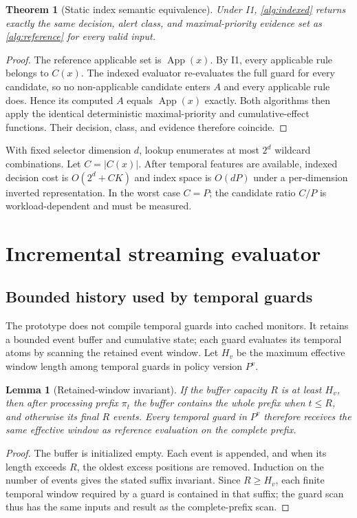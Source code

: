 \documentclass[11pt]{article}
\newtheorem{lemma}{Lemma}[section]
\newtheorem{theorem}{Theorem}[section]
\theoremstyle{remark}
\newcommand{\App}{\operatorname{App}}
\begin{document}
\begin{theorem}[Static index semantic equivalence]\label{thm:indexeq}
Under I1, \cref{alg:indexed} returns exactly the same decision, alert class, and maximal-priority evidence set as \cref{alg:reference} for every valid input.
\end{theorem}
\begin{proof}
The reference applicable set is $\App(x)$. By I1, every applicable rule belongs to $C(x)$. The indexed evaluator re-evaluates the full guard for every candidate, so no non-applicable candidate enters $A$ and every applicable rule does. Hence its computed $A$ equals $\App(x)$ exactly. Both algorithms then apply the identical deterministic maximal-priority and cumulative-effect functions. Their decision, class, and evidence therefore coincide.
\end{proof}

With fixed selector dimension $d$, lookup enumerates at most $2^d$ wildcard combinations. Let $C=|C(x)|$. After temporal features are available, indexed decision cost is $O(2^d+CK)$ and index space is $O(dP)$ under a per-dimension inverted representation. In the worst case $C=P$; the candidate ratio $C/P$ is workload-dependent and must be measured.

\section{Incremental streaming evaluator}

\subsection{Bounded history used by temporal guards}
The prototype does not compile temporal guards into cached monitors. It retains a bounded event buffer and cumulative state; each guard evaluates its temporal atoms by scanning the retained event window. Let $H_v$ be the maximum effective window length among temporal guards in policy version $P^v$.

\begin{lemma}[Retained-window invariant]\label{lem:monitor}
If the buffer capacity $R$ is at least $H_v$, then after processing prefix $\pi_t$ the buffer contains the whole prefix when $t\leq R$, and otherwise its final $R$ events. Every temporal guard in $P^v$ therefore receives the same effective window as reference evaluation on the complete prefix.
\end{lemma}
\begin{proof}
The buffer is initialized empty. Each event is appended, and when its length exceeds $R$, the oldest excess positions are removed. Induction on the number of events gives the stated suffix invariant. Since $R\ge H_v$, each finite temporal window required by a guard is contained in that suffix; the guard scan thus has the same inputs and result as the complete-prefix scan.
\end{proof}
\end{document}
